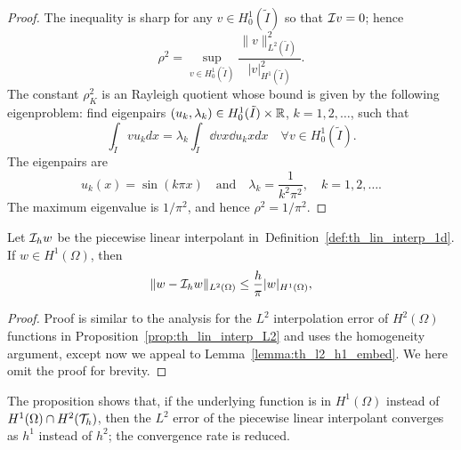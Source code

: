 \begin{proposition}
\begin{proof}
  The inequality is sharp for any $v \in H^1_0(\tilde I)$ so that $\mathcal{I} v = 0$; hence
   \begin{equation*} 
     \rho^2 =\sup_{v \in H^1_0(\tilde I)} \frac{\| v \|^2_{L^2(\tilde I)}}{| v |_{H^1(\tilde I)}^2}.
  \end{equation*}
  The constant $\rho_K^2$ is an Rayleigh quotient whose bound is given by the following eigenproblem: find eigenpairs $(u_k,\lambda_k) \in H^1_0(\tilde I) \times \mathbb{R}$, $k = 1,2,\dots$, such that
  \begin{equation*}
    \int_{\tilde I} v u_k dx = \lambda_k \int_{\tilde I} \dd{v}{x} \dd{u_k}{x} dx \quad \forall v \in H^1_0(\tilde I).
  \end{equation*}
  The eigenpairs are
  \begin{equation*}
    u_k(x) = \sin(k\pi x) \quad \text{and} \quad \lambda_k = \frac{1}{k^2\pi^2}, \quad k = 1,2,\dots.
  \end{equation*}
  The maximum eigenvalue is $1/\pi^2$, and hence $\rho^2 = 1/\pi^2$.
\end{proof}
\end{proposition}

\begin{proposition}
  \label{prop:th_lin_interp_L2_H1}
  Let $\mathcal{I}_h w$ be the piecewise linear interpolant in~Definition~\ref{def:th_lin_interp_1d}. If $w \in H^1(\Omega)$, then
  \begin{equation*}
    \| w - \mathcal{I}_h w \|_{L^2(\Omega)}
    \leq \frac{h}{\pi} | w |_{H^1(\Omega)},
  \end{equation*}
  \begin{proof}
    Proof is similar to the analysis for the $L^2$ interpolation error of $H^2(\Omega)$ functions in Proposition~\ref{prop:th_lin_interp_L2} and uses the homogeneity argument, except now we appeal to Lemma~\ref{lemma:th_l2_h1_embed}. We here omit the proof for brevity.
  \end{proof}
\end{proposition}
The proposition shows that, if the underlying function is in $H^1(\Omega)$ instead of $H^1(\Omega) \cap H^2(\mathcal{T}_h)$, then the $L^2$ error of the piecewise linear interpolant converges as $h^1$ instead of $h^2$; the convergence rate is reduced. 

